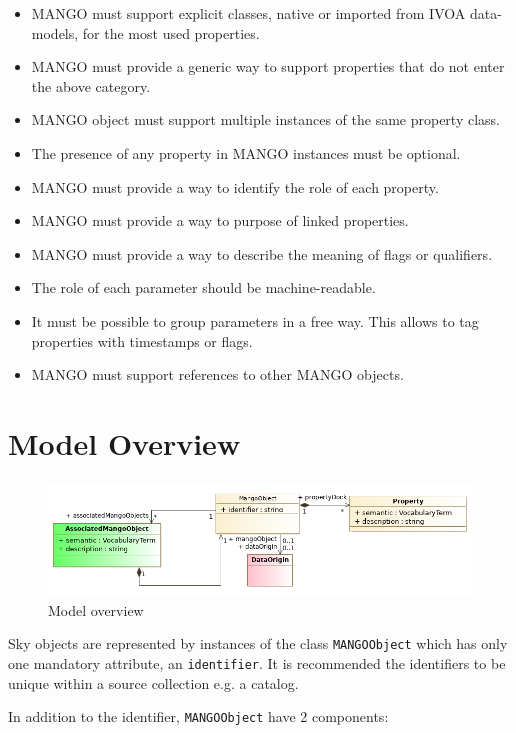 \documentclass[11pt,a4paper]{ivoa}
\begin{document}
\begin{itemize}
    \item MANGO must support explicit classes, native or imported from IVOA data-models, for the most used properties.
    \item MANGO must provide a generic way to support properties that do not enter the above category.
    \item MANGO object must support multiple instances of the same property class.
    \item The presence of any property in MANGO instances must be optional.
    \item MANGO must provide a way to identify the role of each property.
    \item MANGO must provide a way to purpose of linked properties.
    \item  MANGO must provide a way to describe the meaning of flags or qualifiers.
    \item The role of each parameter should be machine-readable.
    \item It must be possible to group parameters in a free way.
          This allows to tag properties with timestamps or flags.
    \item MANGO must support references to other MANGO objects.
 \end{itemize}

\section{Model Overview}

\begin{figure}
     \includegraphics[width=1.0\textwidth]{../model/overview.png}
     \caption{Model overview}
     \label{overview}
\end{figure}

Sky objects are represented by instances of the class \texttt{MANGOObject} which has only
one mandatory attribute, an \texttt{identifier}.
It is recommended the identifiers to be unique within a source collection e.g. a catalog.

In addition to the identifier, \texttt{MANGOObject}  have 2 components:
\end{document}
